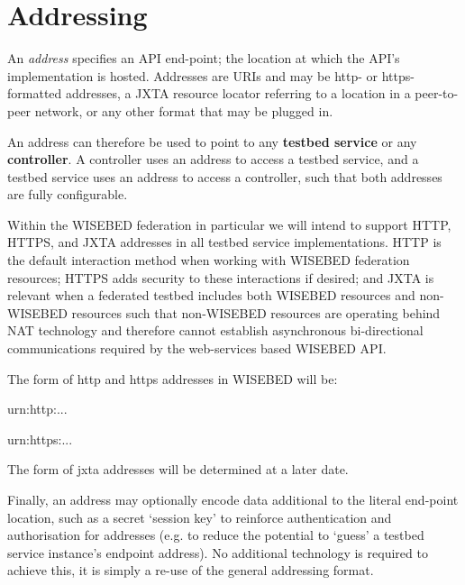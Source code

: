 \section{Addressing}
An {\em address} specifies an API end-point; the location at which the API's implementation is hosted. Addresses are URIs and may be http- or https-formatted addresses, a JXTA resource locator referring to a location in a peer-to-peer network, or any other format that may be plugged in.

An address can therefore be used to point to any {\bf testbed service} or any {\bf controller}. A controller uses an address to access a testbed service, and a testbed service uses an address to access a controller, such that both addresses are fully configurable.

Within the WISEBED federation in particular we will intend to support HTTP, HTTPS, and JXTA addresses in all testbed service implementations. HTTP is the default interaction method when working with WISEBED federation resources; HTTPS adds security to these interactions if desired; and JXTA is relevant when a federated testbed includes both WISEBED resources and non-WISEBED resources such that non-WISEBED resources are operating behind NAT technology and therefore cannot establish asynchronous bi-directional communications required by the web-services based WISEBED API.

The form of http and https addresses in WISEBED will be:
\begin{list}{}
\item urn:http:...
\item urn:https:...
\end{list}

The form of jxta addresses will be determined at a later date.

Finally, an address may optionally encode data additional to the literal end-point location, such as a secret `session key' to reinforce authentication and authorisation for addresses (e.g. to reduce the potential to `guess' a testbed service instance's endpoint address). No additional technology is required to achieve this, it is simply a re-use of the general addressing format.